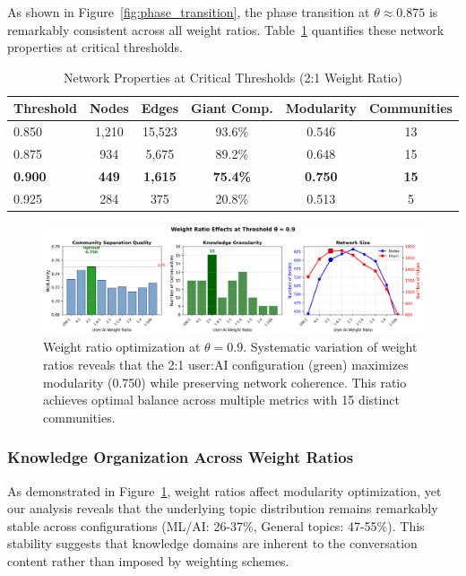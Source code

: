 \documentclass{svproc}
\begin{document}
As shown in Figure~\ref{fig:phase_transition}, the phase transition at $\theta \approx 0.875$ is remarkably consistent across all weight ratios. Table~\ref{tab:threshold_critical} quantifies these network properties at critical thresholds.

\begin{table}[h]
\centering
\caption{Network Properties at Critical Thresholds (2:1 Weight Ratio)}
\label{tab:threshold_critical}
\begin{tabular}{lccccc}
\toprule
\textbf{Threshold} & \textbf{Nodes} & \textbf{Edges} & \textbf{Giant Comp.} & \textbf{Modularity} & \textbf{Communities} \\
\midrule
0.850 & 1,210 & 15,523 & 93.6\% & 0.546 & 13 \\
0.875 & 934 & 5,675 & 89.2\% & 0.648 & 15 \\
\textbf{0.900} & \textbf{449} & \textbf{1,615} & \textbf{75.4\%} & \textbf{0.750} & \textbf{15} \\
0.925 & 284 & 375 & 20.8\% & 0.513 & 5 \\
\bottomrule
\end{tabular}
\end{table}

\begin{figure}[h]
\centering
\includegraphics[width=\textwidth]{./images/weight_ratio_analysis_clean.png}
\caption{Weight ratio optimization at $\theta = 0.9$. Systematic variation of weight ratios reveals that the 2:1 user:AI configuration (green) maximizes modularity (0.750) while preserving network coherence. This ratio achieves optimal balance across multiple metrics with 15 distinct communities.}
\label{fig:weight_ratio_analysis}
\end{figure}

\subsubsection{Knowledge Organization Across Weight Ratios}

As demonstrated in Figure~\ref{fig:weight_ratio_analysis}, weight ratios affect modularity optimization, yet our analysis reveals that the underlying topic distribution remains remarkably stable across configurations (ML/AI: 26-37\%, General topics: 47-55\%). This stability suggests that knowledge domains are inherent to the conversation content rather than imposed by weighting schemes. 
\end{document}
